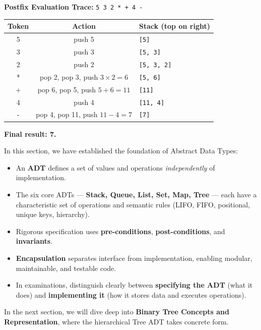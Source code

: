 \documentclass[11pt]{article}
\newcounter{popsec}
\newcounter{popsub}
\newcommand{\courssub}[1]{%
  \stepcounter{popsub}%
  \par\vspace{9pt}\noindent{\popxbold\fontsize{11.5}{13}\selectfont\color{popink}{\color{poporange}\thepopsec.\thepopsub}\hspace{6pt}#1}\par\nopagebreak\vspace{4pt}
}
\begin{document}
\begin{corrige}[Exercise 4]
\textbf{Postfix Evaluation Trace:} \texttt{5 3 2 * + 4 -}

\begin{center}
\begin{tabular}{|c|c|l|}
\hline
\rowcolor{popblueL}
\textbf{Token} & \textbf{Action} & \textbf{Stack (top on right)} \\
\hline
5 & push 5 & \texttt{[5]} \\
3 & push 3 & \texttt{[5, 3]} \\
2 & push 2 & \texttt{[5, 3, 2]} \\
* & pop 2, pop 3, push $3\times2=6$ & \texttt{[5, 6]} \\
+ & pop 6, pop 5, push $5+6=11$ & \texttt{[11]} \\
4 & push 4 & \texttt{[11, 4]} \\
- & pop 4, pop 11, push $11-4=7$ & \texttt{[7]} \\
\hline
\end{tabular}
\end{center}
\textbf{Final result: 7.}
\end{corrige}

\courssub{Summary}

In this section, we have established the foundation of Abstract Data Types:
\begin{itemize}
    \item An \textbf{ADT} defines a set of values and operations \emph{independently} of implementation.
    \item The six core ADTs — \textbf{Stack, Queue, List, Set, Map, Tree} — each have a characteristic set of operations and semantic rules (LIFO, FIFO, positional, unique keys, hierarchy).
    \item Rigorous specification uses \textbf{pre-conditions}, \textbf{post-conditions}, and \textbf{invariants}.
    \item \textbf{Encapsulation} separates interface from implementation, enabling modular, maintainable, and testable code.
    \item In examinations, distinguish clearly between \textbf{specifying the ADT} (what it does) and \textbf{implementing it} (how it stores data and executes operations).
\end{itemize}

In the next section, we will dive deep into \textbf{Binary Tree Concepts and Representation}, where the hierarchical Tree ADT takes concrete form.
\end{document}
